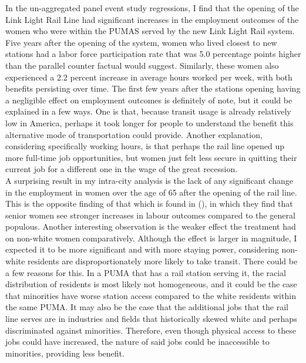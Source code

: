 \documentclass{article}
\begin{document}
In the un-aggregated panel event study regressions, I find that the opening of the Link Light Rail Line had significant increases in the employment outcomes of the women who were within the PUMAS served by the new Link Light Rail system. Five years after the opening of the system, women who lived closest to new stations had a labor force participation rate that was 5.0 percentage points higher than the parallel counter factual would suggest. Similarly, these women also experienced a 2.2 percent increase in average hours worked per week, with both benefits persisting over time. The first few years after the stations opening having a negligible effect on employment outcomes is definitely of note, but it could be explained in a few ways. One is that, because transit usage is already relatively low in America, perhaps it took longer for people to understand the benefit this alternative mode of transportation could provide. Another explanation, considering specifically working hours, is that perhaps the rail line opened up more full-time job opportunities, but women just felt less secure in quitting their current job for a different one in the wage of the great recession. \\

A surprising result in my intra-city analysis is the lack of any significant change in the employment in women over the age of 65 after the opening of the rail line. This is the opposite finding of that which is found in \citeauthor{kim_subways_2019} (\citeyear{kim_subways_2019}), in which they find that senior women see stronger increases in labour outcomes compared to the general populous. Another interesting observation is the weaker effect the treatment had on non-white women comparatively. Although the effect is larger in magnitude, I expected it to be more significant and with more staying power, considering non-white residents are disproportionately more likely to take transit. There could be a few reasons for this. In a PUMA that has a rail station serving it, the racial distribution of residents is most likely not homogeneous, and it could be the case that minorities have worse station access compared to the white residents within the same PUMA. It may also be the case that the additional jobs that the rail line serves are in industries and fields that historically skewed white and perhaps discriminated against minorities. Therefore, even though physical access to these jobs could have increased, the nature of said jobs could be inaccessible to minorities, providing less benefit. \\
\end{document}
